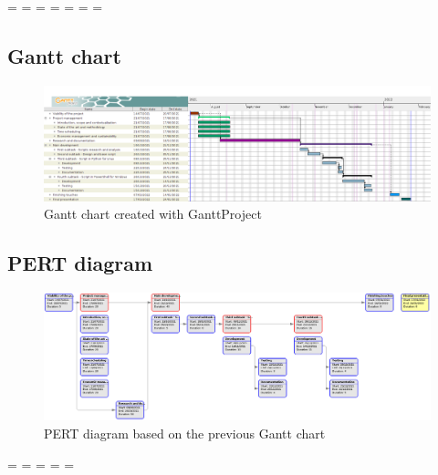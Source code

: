\pagebreak

\paperwidth=\pdfpageheight
\paperheight=\pdfpagewidth
\pdfpageheight=\paperheight
\pdfpagewidth=\paperwidth
\headwidth=\textheight
\begingroup 
\vsize=\textwidth
\hsize=\textheight

\subsection{Gantt chart}
\label{ssec:gantt}

\begin{figure}[!ht]
\hspace{-1.5cm}\includegraphics[width=27cm,trim={0 0 2.7cm 0},clip]{graphics/GanttChart}
\caption{Gantt chart created with GanttProject}
\end{figure}


\newpage

\subsection{PERT diagram}
\label{ssec:pert}

\begin{figure}[!ht]
\vspace{2cm}
\hspace{-0.5cm}\includegraphics[width=25cm]{graphics/PERTChart}
\vspace{0.5cm}
\caption{PERT diagram based on the previous Gantt chart}
\end{figure}

\endgroup

\pagebreak

\paperwidth=\pdfpageheight
\paperheight=\pdfpagewidth
\pdfpageheight=\paperheight
\pdfpagewidth=\paperwidth
\headwidth=\textwidth